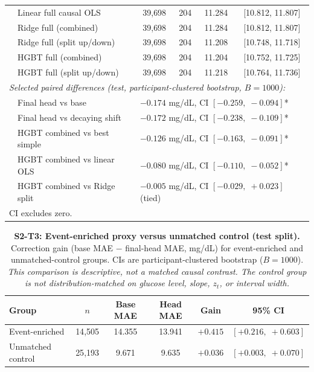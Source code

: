 \begin{table}[H]
\begin{tabular}{llcccc}
      & Linear full causal OLS         & 39{,}698 & 204 & 11.284 & [10.812, 11.807] \\
      & Ridge full (combined)          & 39{,}698 & 204 & 11.284 & [10.812, 11.807] \\
      & Ridge full (split up/down)     & 39{,}698 & 204 & 11.208 & [10.748, 11.718] \\
      & HGBT full (combined)           & 39{,}698 & 204 & 11.204 & [10.752, 11.725] \\
      & HGBT full (split up/down)      & 39{,}698 & 204 & 11.218 & [10.764, 11.736] \\
    \midrule
    \multicolumn{6}{l}{\textit{Selected paired differences (test, participant-clustered bootstrap, $B=1000$):}} \\[2pt]
    & Final head vs base              & \multicolumn{4}{l}{$-0.174$ mg/dL, CI $[-0.259,\;-0.094]$*} \\
    & Final head vs decaying shift    & \multicolumn{4}{l}{$-0.172$ mg/dL, CI $[-0.238,\;-0.109]$*} \\
    & HGBT combined vs best simple    & \multicolumn{4}{l}{$-0.126$ mg/dL, CI $[-0.163,\;-0.091]$*} \\
    & HGBT combined vs linear OLS     & \multicolumn{4}{l}{$-0.080$ mg/dL, CI $[-0.110,\;-0.052]$*} \\
    & HGBT combined vs Ridge split    & \multicolumn{4}{l}{$-0.005$ mg/dL, CI $[-0.029,\;+0.023]$ (tied)} \\
    \bottomrule
    \multicolumn{6}{l}{\small * CI excludes zero.} \\
  \end{tabular}
\end{table}

\begin{table}[H]
  \centering
  \caption{%
    \textbf{S2-T3: Event-enriched proxy versus unmatched control (test split).}
    Correction gain (base MAE $-$ final-head MAE, mg/dL) for event-enriched
    and unmatched-control groups.
    CIs are participant-clustered bootstrap ($B=1000$).
    \emph{This comparison is descriptive, not a matched causal contrast.
    The control group is not distribution-matched on glucose level, slope,
    $z_t$, or interval width.}%
  }
  \label{tab:study2_event_rich}
  \small
  \begin{tabular}{lccccc}
    \toprule
    Group & $n$ & Base MAE & Head MAE & Gain & 95\% CI \\
    \midrule
    Event-enriched  & 14{,}505 & 14.355 & 13.941 & $+0.415$ & $[+0.216,\;+0.603]$ \\
    Unmatched control & 25{,}193 & 9.671 & 9.635  & $+0.036$ & $[+0.003,\;+0.070]$ \\
    \bottomrule
  \end{tabular}
\end{table}

